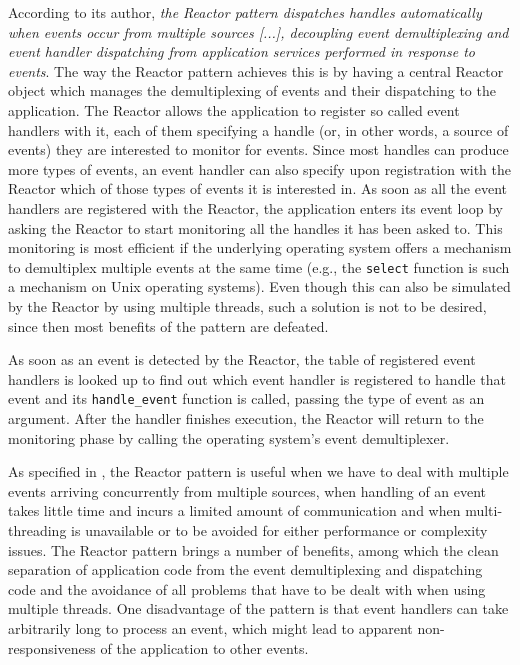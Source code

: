 \documentclass[a4paper,10pt]{article}
\begin{document}
According to its author, \emph{the Reactor pattern dispatches handles automatically when events occur
from multiple sources [...], decoupling event demultiplexing and event handler dispatching from application
services performed in response to events}. The way the Reactor pattern achieves this is by having a
central Reactor object which manages the demultiplexing of events and their dispatching to the application.
The Reactor allows the application to register so called event handlers with it, each of them specifying a
handle (or, in other words, a source of events) they are interested to monitor for events. Since most handles
can produce more types of events, an event handler can also specify upon registration with the Reactor
which of those types of events it is interested in. As soon as all the event handlers are registered with the
Reactor, the application enters its event loop by asking the Reactor to start monitoring all the handles it
has been asked to. This monitoring is most efficient if the underlying operating system offers a mechanism
to demultiplex multiple events at the same time (e.g., the \texttt{select} function is such a mechanism
on Unix operating systems). Even though this can also be simulated by the Reactor by using multiple threads,
such a solution is not to be desired, since then most benefits of the pattern are defeated.

As soon as an event is detected by the Reactor, the table of registered event handlers is looked up to
find out which event handler is registered to handle that event and its \texttt{handle\_event} function
is called, passing the type of event as an argument. After the handler finishes execution, the Reactor will
return to the monitoring phase by calling the operating system's event demultiplexer.

As specified in \cite{226255}, the Reactor pattern is useful when we have to deal with multiple events
arriving concurrently from multiple sources, when handling of an event takes little time and incurs a limited
amount of communication and when multi-threading is unavailable or to be avoided for either performance
or complexity issues. The Reactor pattern brings a number of benefits, among which the clean separation of
application code from the event demultiplexing and dispatching code and the avoidance of all problems that
have to be dealt with when using multiple threads. One disadvantage of the pattern is that event handlers
can take arbitrarily long to process an event, which might lead to apparent non-responsiveness of the application
to other events.
\end{document}
